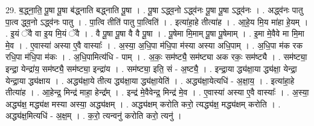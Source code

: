 \documentclass[17pt]{extarticle}
\begin{document}
29. ब॒द्ध्ना॒ति॒ पू॒षा पू॒षा ब॑द्ध्नाति बद्ध्नाति पू॒षा । . पू॒षा ऽद्ध्व॒नो ऽद्ध्व॑नः पू॒षा पू॒षा ऽद्ध्व॑नः । . अद्ध्व॑नः पातु पा॒त्व द्ध्व॒नो ऽद्ध्व॑नः पातु । . पा॒त्वि तीति॑ पातु पा॒त्विति॑ । . इत्या॑हा॒हे तीत्या॑ह । . आ॒हे॒य मि॒य मा॑हा हे॒यम् । . इ॒यं ॅवै वा इ॒य मि॒यं ॅवै । . वै पू॒षा पू॒षा वै वै पू॒षा । . पू॒षेमा मि॒माम् पू॒षा पू॒षेमाम् । . इ॒मा मे॒वैवे मा मि॒मा मे॒व । . ए॒वास्या॑ अस्या ए॒वै वास्याः᳚ । . अ॒स्या॒ अ॒धि॒पा म॑धि॒पा म॑स्या अस्या अधि॒पाम् । . अ॒धि॒पा म॑क रक रधि॒पा म॑धि॒पा म॑कः । . अ॒धि॒पामित्य॑धि - पाम् । . अ॒कः॒ सम॑ष्ट्यै॒ सम॑ष्ट्या अक रकः॒ सम॑ष्ट्यै । . सम॑ष्ट्या॒ इन्द्रा॒ येन्द्रा॑य॒ सम॑ष्ट्यै॒ सम॑ष्ट्या॒ इन्द्रा॑य । . सम॑ष्ट्या॒ इति॒ सं - अ॒ष्ट्यै॒ । . इन्द्रा॒या द्ध्य॑क्षा॒या द्ध्य॑क्षा॒ येन्द्रा॒ येन्द्रा॒या द्ध्य॑क्षाय । . अद्ध्य॑क्षा॒ये तीत्य द्ध्य॑क्षा॒या द्ध्य॑क्षा॒येति॑ । . अद्ध्य॑क्षा॒येत्यधि॑ - अ॒क्षा॒य॒ । . इत्या॑हा॒हे तीत्या॑ह । . आ॒हेन्द्र॒ मिन्द्र॑ माहा॒ हेन्द्र᳚म् । . इन्द्र॑ मे॒वैवेन्द्र॒ मिन्द्र॑ मे॒व । . ए॒वास्या॑ अस्या ए॒वै वास्याः᳚ । . अ॒स्या॒ अद्ध्य॑क्ष॒ मद्ध्य॑क्ष मस्या अस्या॒ अद्ध्य॑क्षम् । . अद्ध्य॑क्षम् करोति करो॒ त्यद्ध्य॑क्ष॒ मद्ध्य॑क्षम् करोति । . अद्ध्य॑क्ष॒मित्यधि॑ - अ॒क्ष॒म् । . क॒रो॒ त्यन्वनु॑ करोति करो॒ त्यनु॑ । \newline
\end{document}
